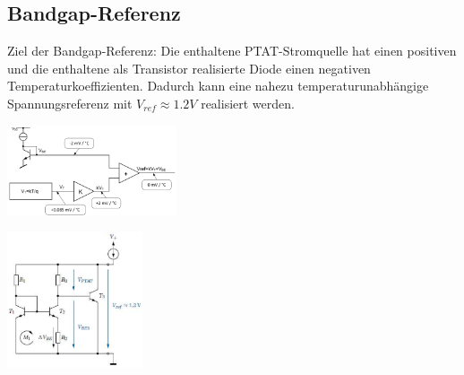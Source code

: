         \subsection{Bandgap-Referenz}
            \begin{minipage}[T]{10cm}
                Ziel der Bandgap-Referenz: Die enthaltene PTAT-Stromquelle hat einen positiven und die enthaltene als Transistor realisierte Diode einen negativen Temperaturkoeffizienten. Dadurch kann eine nahezu temperaturunabh\"angige Spannungsreferenz mit $V_{ref}\approx 1.2V$ realisiert werden.
            \end{minipage}
            \begin{minipage}[T]{5cm}
                \includegraphics[width=5cm]{./bilder/BandgapBlocksch.png}
            \end{minipage}
            \begin{minipage}[T]{4cm}
                \includegraphics[width=4cm]{./bilder/Bandgap.png}
            \end{minipage}
\newpage
